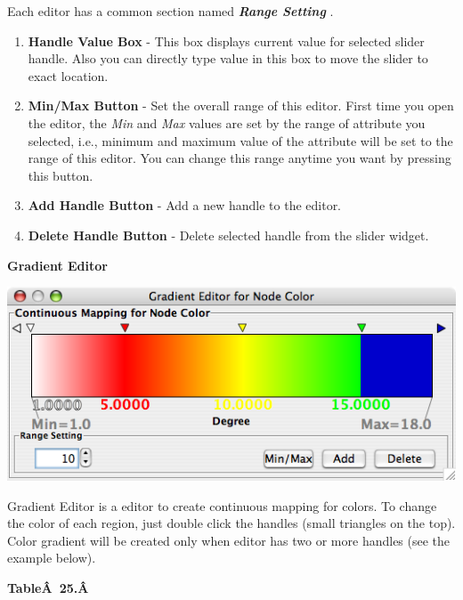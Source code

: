  Each editor has a common section named \emph{\textbf{Range Setting}
}
. 
\begin{enumerate}
\item 

 \textbf{Handle Value Box}
 - This box displays current value for selected slider handle. Also you can directly type value in this box to move the slider to exact location. 

\item 

 \textbf{Min/Max Button}
 - Set the overall range of this editor. First time you open the editor, the \emph{Min}
 and \emph{Max}
 values are set by the range of attribute you selected, i.e., minimum and maximum value of the attribute will be set to the range of this editor. You can change this range anytime you want by pressing this button. 

\item 

 \textbf{Add Handle Button}
 - Add a new handle to the editor. 

\item 

 \textbf{Delete Handle Button}
 - Delete selected handle from the slider widget. 


\end{enumerate}


 
\textbf{Gradient Editor}


 \includegraphics[width=.6\textwidth]{images/GradientEditorSample26.png} 


 Gradient Editor is a editor to create continuous mapping for colors. To change the color of each region, just double click the handles (small triangles on the top). Color gradient will be created only when editor has two or more handles (see the example below). 


 \textbf{Table\^A 25.\^A }



